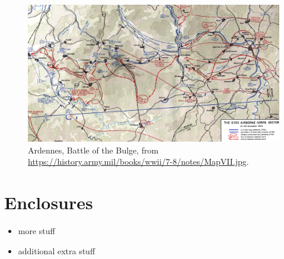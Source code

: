 \documentclass[letterpaper,tgtermes,9pt,microtype,colorlinks=true,urlcolor=blue,DIV=calc,pagesize]{scrartcl}
\begin{document}
\begin{figure}[htbp]
\centering
\includegraphics[width=.9\linewidth]{./example.org_imgs/g14eJd20240804T153654.png}
\caption{Ardennes, Battle of the Bulge, from \url{https://history.army.mil/books/wwii/7-8/notes/MapVII.jpg}.}
\end{figure}
\section{Enclosures}
\label{sec:org1762e9d}
\begin{itemize}
\item more stuff
\item additional extra stuff
\end{itemize}
\end{document}
